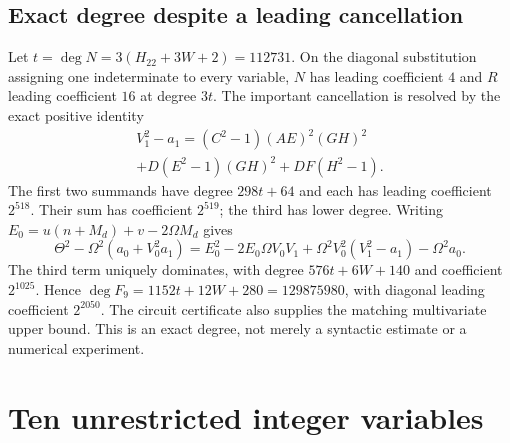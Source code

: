 \documentclass[11pt]{article}
\begin{document}
\subsection{Exact degree despite a leading cancellation}
Let $t=\deg N=3(H_{22}+3W+2)=112731$. On the diagonal substitution assigning
one indeterminate to every variable, $N$ has leading coefficient $4$ and
$R$ leading coefficient $16$ at degree $3t$. The important cancellation is
resolved by the exact positive identity
\[\begin{gathered}
V_1^2-a_1={}(C^2-1)(AE)^2(GH)^2\\
+D(E^2-1)(GH)^2+DF(H^2-1).
\end{gathered}\]
The first two summands have degree $298t+64$ and each has leading coefficient
$2^{518}$. Their sum has coefficient $2^{519}$; the third has lower degree.
Writing $E_0=u(n+M_d)+v-2\Omega M_d$ gives
\[
 \Theta^2-\Omega^2(a_0+V_0^2a_1)
 =E_0^2-2E_0\Omega V_0V_1+\Omega^2V_0^2(V_1^2-a_1)-\Omega^2a_0.
\]
The third term uniquely dominates, with degree $576t+6W+140$ and coefficient
$2^{1025}$. Hence $\deg F_9=1152t+12W+280=129875980$, with diagonal leading
coefficient $2^{2050}$. The circuit certificate also supplies the matching
multivariate upper bound. This is an exact degree, not merely a syntactic
estimate or a numerical experiment.

\section{Ten unrestricted integer variables}
\end{document}
